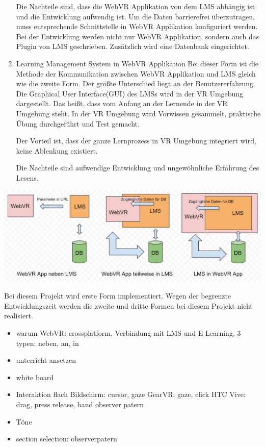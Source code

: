 \begin{enumerate}
     Die Nachteile sind, dass die WebVR Applikation von dem LMS abhängig ist und die Entwicklung aufwendig ist. Um die Daten barrierefrei überzutragen, muss entsprechende Schnittstelle in WebVR Applikation konfiguriert werden. Bei der Entwicklung werden nicht nur WebVR Applikation, sondern auch das Plugin von LMS geschrieben. Zusätzlich wird eine Datenbank eingerichtet.
     
    \item Learning Management System in WebVR Applikation
     \subitem Bei dieser Form ist die Methode der Kommunikation zwischen WebVR Applikation und LMS gleich wie die zweite Form. Der größte Unterschied liegt an der Benutzererfahrung. Die Graphical User Interface(GUI) des LMSs wird in der VR Umgebung dargestellt. Das heißt, dass vom Anfang an der Lernende in der VR Umgebung steht. In der VR Umgebung wird Vorwissen gesammelt, praktische Übung durchgeführt und Test gemacht.
     
     Der Vorteil ist, dass der ganze Lernprozess in VR Umgebung integriert wird, keine Ablenkung existiert.
     
     Die Nachteile sind aufwendige Entwicklung und ungewöhnliche Erfahrung des Lesens.
\end{enumerate}
\includegraphics[width=\textwidth]{images/formenDerVerbindung.jpg}

Bei diesem Projekt wird erste Form implementiert. Wegen der begrenzte Entwicklungszeit werden die zweite und dritte Formen bei diesem Projekt nicht realisiert.




\begin{itemize}
\item warum WebVR: crossplatform, Verbindung mit LMS und E-Learning, 3 typen: neben, an, in
\item unterricht ansetzen
\item white board
\item Interaktion
\subitem flach Bildschirm: cursor, gaze
\subitem GearVR: gaze, click
\subitem HTC Vive: drag, press release, hand
\subitem observer patern
\item Töne
\item section selection: observerpatern
\end{itemize}